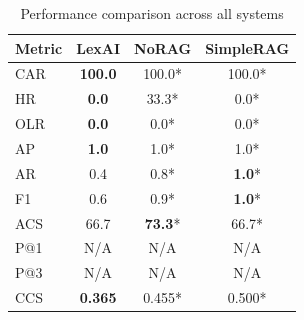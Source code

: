 \begin{table}[ht]
\centering
\caption{Performance comparison across all systems}
\label{tab:main_results}
\begin{tabular}{lccc}
\toprule
\textbf{Metric} & \textbf{LexAI} & \textbf{NoRAG} & \textbf{SimpleRAG} \\
\midrule
CAR & \textbf{100.0} & 100.0* & 100.0* \\
HR & \textbf{0.0} & 33.3* & 0.0* \\
OLR & \textbf{0.0} & 0.0* & 0.0* \\
AP & \textbf{1.0} & 1.0* & 1.0* \\
AR & 0.4 & 0.8* & \textbf{1.0}* \\
F1 & 0.6 & 0.9* & \textbf{1.0}* \\
ACS & 66.7 & \textbf{73.3}* & 66.7* \\
P@1 & N/A & N/A & N/A \\
P@3 & N/A & N/A & N/A \\
CCS & \textbf{0.365} & 0.455* & 0.500* \\
\bottomrule
\end{tabular}
\end{table}